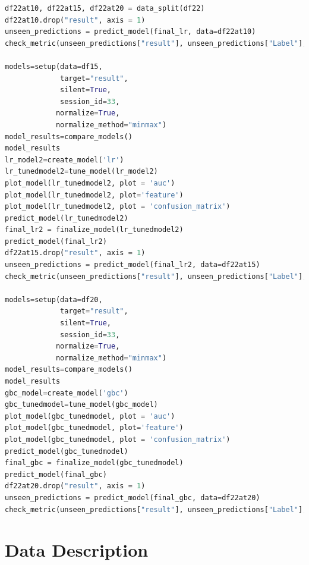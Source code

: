 \begin{lstlisting}[language=python,label={lst:pythoncode}]
df22at10, df22at15, df22at20 = data_split(df22)
df22at10.drop("result", axis = 1)
unseen_predictions = predict_model(final_lr, data=df22at10)
check_metric(unseen_predictions["result"], unseen_predictions["Label"], metric = "AUC")

models=setup(data=df15,
             target="result",
             silent=True,
             session_id=33,
            normalize=True,
            normalize_method="minmax")
model_results=compare_models()
model_results
lr_model2=create_model('lr')
lr_tunedmodel2=tune_model(lr_model2)
plot_model(lr_tunedmodel2, plot = 'auc')
plot_model(lr_tunedmodel2, plot='feature')
plot_model(lr_tunedmodel2, plot = 'confusion_matrix')
predict_model(lr_tunedmodel2)
final_lr2 = finalize_model(lr_tunedmodel2)
predict_model(final_lr2)
df22at15.drop("result", axis = 1)
unseen_predictions = predict_model(final_lr2, data=df22at15)
check_metric(unseen_predictions["result"], unseen_predictions["Label"], metric = "AUC")

models=setup(data=df20,
             target="result",
             silent=True,
             session_id=33,
            normalize=True,
            normalize_method="minmax")
model_results=compare_models()
model_results
gbc_model=create_model('gbc')
gbc_tunedmodel=tune_model(gbc_model)
plot_model(gbc_tunedmodel, plot = 'auc')
plot_model(gbc_tunedmodel, plot='feature')
plot_model(gbc_tunedmodel, plot = 'confusion_matrix')
predict_model(gbc_tunedmodel)
final_gbc = finalize_model(gbc_tunedmodel)
predict_model(final_gbc)
df22at20.drop("result", axis = 1)
unseen_predictions = predict_model(final_gbc, data=df22at20)
check_metric(unseen_predictions["result"], unseen_predictions["Label"], metric = "Recall")
\end{lstlisting}


\chapter{Data Description}\label{ch:Data Description}

